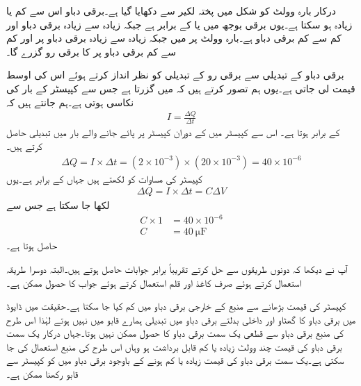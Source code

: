 درکار بارہ وولٹ کو شکل  میں پختہ لکیر سے دکھایا گیا ہے۔برقی دباو اس سے  کم یا زیادہ ہو سکتا ہے۔یوں برقی بوجھ میں   یا  کے برابر ہے جبکہ زیادہ سے زیادہ برقی دباو  اور کم سے کم برقی دباو  ہے۔بارہ وولٹ پر  میں  جبکہ زیادہ سے زیادہ برقی دباو پر   اور کم سے کم برقی دباو پر   کا برقی رو گزرے گا۔

برقی دباو کے تبدیلی سے برقی رو کے تبدیلی کو نظر انداز کرتے ہوئے اس کی اوسط قیمت لی جاتی ہے۔یوں ہم تصور کرتے ہیں کہ  میں  گزرتا ہے جس سے کپیسٹر کے بار کی نکاسی ہوتی ہے۔ہم جانتے ہیں کہ
\begin{align*}
I=\frac{\Delta Q}{\Delta t}
\end{align*}
کے برابر ہوتا ہے۔ اس سے کپیسٹر میں   کے دوران کپیسٹر پر پائے جانے والے بار میں تبدیلی  حاصل کرتے ہیں۔
\begin{align*}
\Delta Q=I \times \Delta t=\left(2 \times 10^{-3} \right) \times \left(20 \times 10^{-3} \right)=40 \times 10^{-6}
\end{align*}
کپیسٹر کی مساوات  کو  لکھتے ہیں جہاں  کے برابر ہے۔یوں
\begin{align*}
\Delta Q=I \times \Delta t=C \Delta V
\end{align*}
لکھا جا سکتا ہے جس سے
\begin{align*}
C \times 1&=40 \times 10^{-6}\\
C&=\SI{40}{\micro \farad}
\end{align*}
حاصل ہوتا ہے۔

آپ نے دیکھا کہ دونوں طریقوں سے حل کرتے تقریباً برابر جوابات حاصل ہوتے ہیں۔البتہ دوسرا طریقہ استعمال کرتے ہوئے صرف کاغذ اور قلم استعمال کرتے ہوئے جواب کا حصول ممکن ہے۔

کپیسٹر کی قیمت بڑھانے سے منبع کے خارجی برقی دباو میں  کم کیا جا سکتا ہے۔حقیقت میں ڈایوڈ میں برقی دباو کا گھٹاو اور داخلی بدلتے برقی دباو میں تبدیلی ہمارے قابو میں نہیں ہوتے لہٰذا اس طرح کی منبع برقی دباو سے قطعی یک سمت برقی دباو کا حصول ممکن نہیں ہوتا۔جہاں درکار یک سمت برقی دباو کی  قیمت چند وولٹ زیادہ یا کم  قابل برداشت ہو وہاں اس طرح کی منبع استعمال کی جا سکتی ہے۔یک سمت برقی دباو کی قیمت زیادہ یا کم ہونے کے باوجود برقی دباو میں  کو کپیسٹر سے قابو رکھنا ممکن ہے۔


